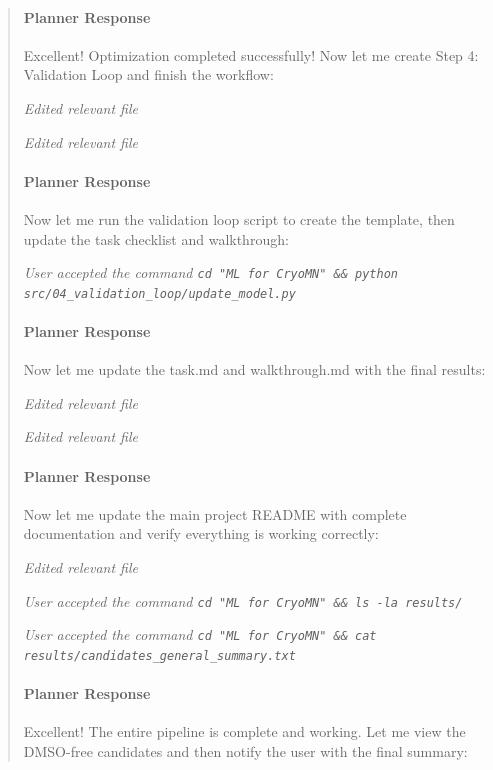 \documentclass[preprint,12pt]{elsarticle}
\newenvironment{promptbar}{\begin{quote}\scriptsize\raggedright\sloppy}{\end{quote}}
\begin{document}
\begin{promptbar}
\paragraph*{Planner Response}

Excellent! Optimization completed successfully! Now let me create Step 4: Validation Loop and finish the workflow:

\textit{Edited relevant file}

\textit{Edited relevant file}

\paragraph*{Planner Response}

Now let me run the validation loop script to create the template, then update the task checklist and walkthrough:

\textit{User accepted the command \texttt{cd "ML for CryoMN" \&\& python src/04\_validation\_loop/update\_model.py}}

\paragraph*{Planner Response}

Now let me update the task.md and walkthrough.md with the final results:

\textit{Edited relevant file}

\textit{Edited relevant file}

\paragraph*{Planner Response}

Now let me update the main project README with complete documentation and verify everything is working correctly:

\textit{Edited relevant file}

\textit{User accepted the command \texttt{cd "ML for CryoMN" \&\& ls -la results/}}

\textit{User accepted the command \texttt{cd "ML for CryoMN" \&\& cat results/candidates\_general\_summary.txt}}

\paragraph*{Planner Response}

Excellent! The entire pipeline is complete and working. Let me view the DMSO-free candidates and then notify the user with the final summary:


\end{promptbar}
\end{document}
